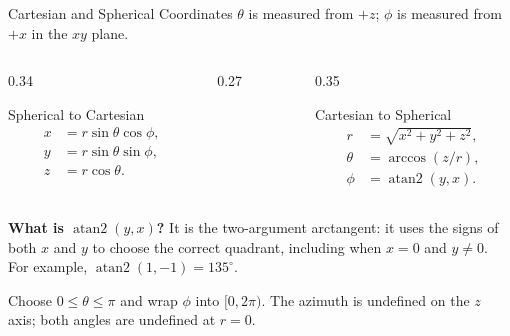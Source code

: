 \begin{frame}{Cartesian and Spherical Coordinates}
  \small
  $\theta$ is measured from $+z$; $\phi$ is measured from $+x$ in the $xy$ plane.
  \begin{columns}[T,onlytextwidth]
    \begin{column}{0.34\textwidth}
      \begin{block}{Spherical to Cartesian}
        \[
          \begin{aligned}
            x&=r\sin\theta\cos\phi,\\
            y&=r\sin\theta\sin\phi,\\
            z&=r\cos\theta.
          \end{aligned}
        \]
      \end{block}
    \end{column}
    \begin{column}{0.27\textwidth}
      \centering
      \resizebox{\linewidth}{!}{}
    \end{column}
    \begin{column}{0.35\textwidth}
      \begin{block}{Cartesian to Spherical}
        \[
          \begin{aligned}
            r&=\sqrt{x^2+y^2+z^2},\\
            \theta&=\arccos(z/r),\\
            \phi&=\operatorname{atan2}(y,x).
          \end{aligned}
        \]
      \end{block}
    \end{column}
  \end{columns}
  \footnotesize
  \textbf{What is $\operatorname{atan2}(y,x)$?}
  It is the two-argument arctangent: it uses the signs of both $x$ and $y$
  to choose the correct quadrant, including when $x=0$ and $y\ne0$.
  For example, $\operatorname{atan2}(1,-1)=135^\circ$.

  Choose $0\le\theta\le\pi$ and wrap $\phi$ into $[0,2\pi)$.
  The azimuth is undefined on the $z$ axis; both angles are undefined at $r=0$.
\end{frame}

